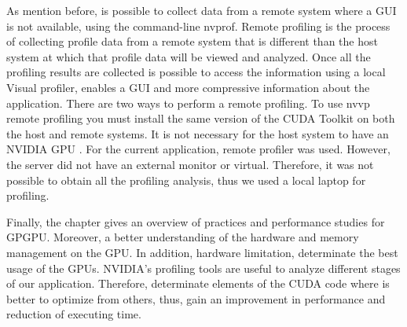As mention before, is possible to collect data from a remote system where a GUI is not available, using the command-line nvprof. Remote profiling is the process of collecting profile data from a remote system that is different than the host system at which that profile data will be viewed and analyzed. Once all the profiling results are collected is possible to access the information using a local Visual profiler, enables a GUI and more compressive information about the application. There are two ways to perform a remote profiling. To use nvvp remote profiling you must install the same version of the CUDA Toolkit on both the host and remote systems. It is not necessary for the host system to have an NVIDIA GPU \cite{tool}. For the current application, remote profiler was used. However, the server did not have an external monitor or virtual. Therefore, it was not possible to obtain all the profiling analysis, thus we used a local laptop for profiling.

\vspace{4.0em}

Finally, the chapter gives an overview of practices and performance studies for GPGPU. Moreover, a better understanding of the hardware and memory management on the GPU. In addition, hardware limitation, determinate the best usage of the GPUs. NVIDIA's profiling tools are useful to analyze different stages of our application. Therefore, determinate elements of the CUDA code where is better to optimize from others, thus, gain an improvement in performance and reduction of executing time.


